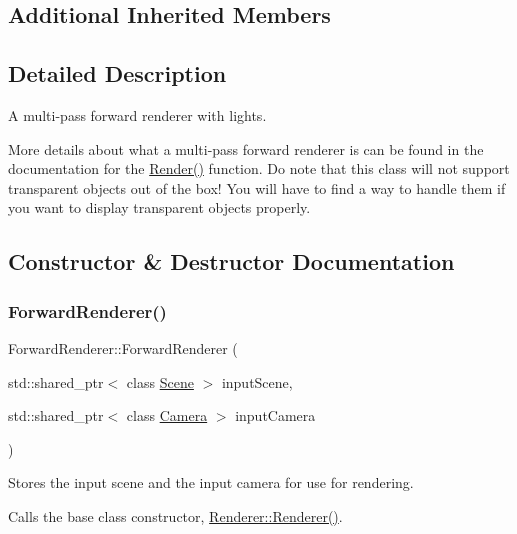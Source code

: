 \subsection*{Additional Inherited Members}


\subsection{Detailed Description}
A multi-\/pass forward renderer with lights. 

More details about what a multi-\/pass forward renderer is can be found in the documentation for the \hyperlink{class_forward_renderer_a1a5deafa5deaf1e0abaab0e2074928c1}{Render()} function. Do note that this class will not support transparent objects out of the box! You will have to find a way to handle them if you want to display transparent objects properly. 

\subsection{Constructor \& Destructor Documentation}
\hypertarget{class_forward_renderer_af8ed84e45085c4dc60d565fcc3c198d1}{}\label{class_forward_renderer_af8ed84e45085c4dc60d565fcc3c198d1} 
\subsubsection{\texorpdfstring{Forward\+Renderer()}{ForwardRenderer()}}
{\footnotesize\ttfamily Forward\+Renderer\+::\+Forward\+Renderer (\begin{DoxyParamCaption}\item[{std\+::shared\+\_\+ptr$<$ class \hyperlink{class_scene}{Scene} $>$}]{input\+Scene,  }\item[{std\+::shared\+\_\+ptr$<$ class \hyperlink{class_camera}{Camera} $>$}]{input\+Camera }\end{DoxyParamCaption})}



Stores the input scene and the input camera for use for rendering. 

Calls the base class constructor, \hyperlink{class_renderer_adc8ce31cd649bdf220ca8355809b1d06}{Renderer\+::\+Renderer()}. \hypertarget{class_forward_renderer_ab27ea6139730631d79488cec3c564597}{}\label{class_forward_renderer_ab27ea6139730631d79488cec3c564597} 
